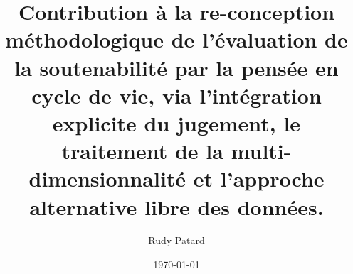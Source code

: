 \documentclass[12pt,twoside,a4paper,english,french]{book} %
\title{Contribution à la re-conception méthodologique de l'évaluation de la soutenabilité par la pensée en cycle de vie, via l'intégration explicite du jugement, le traitement de la multi-dimensionnalité et l'approche alternative libre des données.}
\author{Rudy Patard}
\date{\today}
\begin{document}
\frontmatter %
\begin{titlepage}




\end{titlepage}
\end{document}
